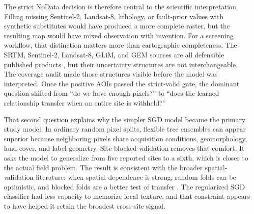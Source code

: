\documentclass[numrefs]{interact}
\let\cite\citep
\theoremstyle{plain}%
\theoremstyle{definition}
\theoremstyle{remark}
\begin{document}
The strict NoData decision is therefore central to the scientific interpretation. Filling missing Sentinel-2, Landsat-8, lithology, or fault-prior values with synthetic substitutes would have produced a more complete raster, but the resulting map would have mixed observation with invention. For a screening workflow, that distinction matters more than cartographic completeness. The SRTM, Sentinel-2, Landsat-8, GLiM, and GEM sources are all defensible published products \cite{farr2007srtm,drusch2012sentinel,roy2014landsat8,hartmann2012glim,styron2020gem}, but their uncertainty structures are not interchangeable. The coverage audit made those structures visible before the model was interpreted. Once the positive AOIs passed the strict-valid gate, the dominant question shifted from ``do we have enough pixels?'' to ``does the learned relationship transfer when an entire site is withheld?''

That second question explains why the simpler SGD model became the primary study model. In ordinary random pixel splits, flexible tree ensembles can appear superior because neighboring pixels share acquisition conditions, geomorphology, land cover, and label geometry. Site-blocked validation removes that comfort. It asks the model to generalize from five reported sites to a sixth, which is closer to the actual field problem. The result is consistent with the broader spatial-validation literature: when spatial dependence is strong, random folds can be optimistic, and blocked folds are a better test of transfer \cite{roberts2017crossvalidation,valavi2019blockcv}. The regularized SGD classifier had less capacity to memorize local texture, and that constraint appears to have helped it retain the broadest cross-site signal.
\end{document}
